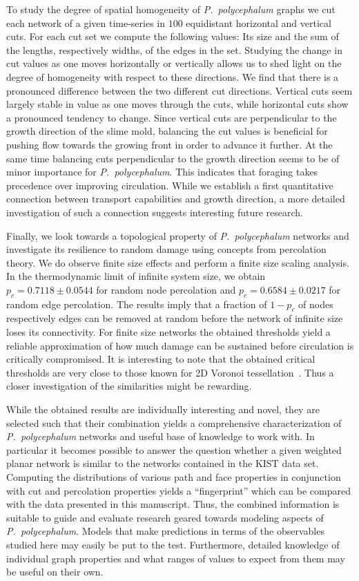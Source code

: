 			To study the degree of spatial homogeneity of \emph{P.~polycephalum} graphs we cut each network of a given time-series in $100$ equidistant horizontal and vertical cuts. For each cut set we compute the following values: Its size and the sum of the lengths, respectively widths, of the edges in the set. Studying the change in cut values as one moves horizontally or vertically allows us to shed light on the degree of homogeneity with respect to these directions. We find that there is a pronounced difference between the two different cut directions. Vertical cuts seem largely stable in value as one moves through the cuts, while horizontal cuts show a pronounced tendency to change. Since vertical cuts are perpendicular to the growth direction of the slime mold, balancing the cut values is beneficial for pushing flow towards the growing front in order to advance it further. At the same time balancing cuts perpendicular to the growth direction seems to be of minor importance for \emph{P.~polycephalum}. This indicates that foraging takes precedence over improving circulation. While we establish a first quantitative connection between transport capabilities and growth direction, a more detailed investigation of such a connection suggests interesting future research.

			Finally, we look towards a topological property of \emph{P.~polycephalum} networks and investigate its resilience to random damage using concepts from percolation theory. We do observe finite size effects and perform a finite size scaling analysis. In the thermodynamic limit of infinite system size, we obtain $p_c = 0.7118 \pm 0.0544$ for random node percolation and $p_c = 0.6584 \pm 0.0217$ for random edge percolation. The results imply that a fraction of $1-p_c$ of nodes respectively edges can be removed at random before the network of infinite size loses its connectivity. For finite size networks the obtained thresholds yield a reliable approximation of how much damage can be sustained before circulation is critically compromised. It is interesting to note that the obtained critical thresholds are very close to those known for 2D Voronoi tessellation~\cite{becker2009percolation}. Thus a closer investigation of the similarities might be rewarding.

			While the obtained results are individually interesting and novel, they are selected such that their combination yields a comprehensive characterization of \emph{P.~polycephalum} networks and useful base of knowledge to work with. In particular it becomes possible to answer the question whether a given weighted planar network is similar to the networks contained in the KIST data set. Computing the distributions of various path and face properties in conjunction with cut and percolation properties yields a ``fingerprint'' which can be compared with the data presented in this manuscript. Thus, the combined information is suitable to guide and evaluate research geared towards modeling aspects of \emph{P.~polycephalum}. Models that make predictions in terms of the observables studied here may easily be put to the test. Furthermore, detailed knowledge of individual graph properties and what ranges of values to expect from them may be useful on their own.

